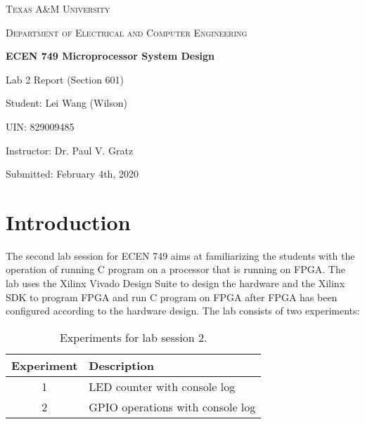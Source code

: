 \documentclass[11pt,letterpaper,titlepage]{article}
\begin{document}
\begin{titlepage}
  \centering
	{\scshape\large Texas A\&M University \par}
	\vspace{1cm}
	{\scshape\Large Department of Electrical and Computer Engineering \par}
	\vspace{4cm}
    \vspace{0.5cm}
	{\huge\bfseries ECEN 749 Microprocessor System Design\par}
	\vspace{4cm}
	{\Large Lab 2 Report (Section 601)\par}
	\vspace{1cm}
	{\Large Student: Lei Wang (Wilson)\par}
	\vspace{1cm}
	{\Large UIN: 829009485\par}
	\vspace{1cm}
	{\Large Instructor: Dr. Paul V. Gratz\par}
	\vspace{4cm}
	\vfill

	{\large Submitted: February 4th, 2020 \par}

\end{titlepage}

\newpage

\tableofcontents{}

\newpage

\section{Introduction}

The second lab session for ECEN 749 aims at familiarizing the students with the operation of running C program on a processor that is running on FPGA. The lab uses the Xilinx Vivado Design Suite to design the hardware and the Xilinx SDK to program FPGA and run C program on FPGA after FPGA has been configured according to the hardware design. The lab consists of two experiments:

\begin{table}[ht]
\centering
\begin{tabular}{@{}cl@{}}
\toprule
Experiment & Description                      \\ \midrule
1          & LED counter with console log     \\ \midrule
2          & GPIO operations with console log \\ \bottomrule
\end{tabular}
\caption{Experiments for lab session 2.}
\end{table}
\end{document}

